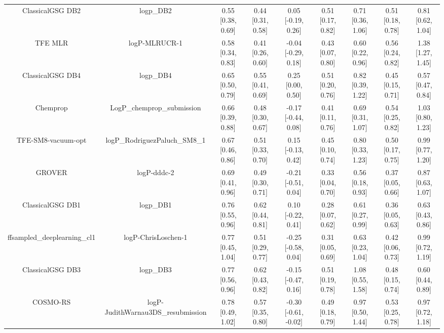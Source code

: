 \documentclass{article}
\begin{document}
\begin{center}
\begin{longtable}{|ccccccccc|}
\bottomrule
\endlastfoot
            ClassicalGSG DB2 &                                     logp\_DB2 & 0.55 [0.38, 0.69] & 0.44 [0.31, 0.58] &   0.05 [-0.19, 0.26] & 0.51 [0.17, 0.82] &    0.71 [0.36, 1.06] &    0.51 [0.18, 0.78] &    0.81 [0.62, 1.04] \\
                     TFE MLR &                                 logP-MLRUCR-1 & 0.58 [0.34, 0.83] & 0.41 [0.26, 0.60] &  -0.04 [-0.29, 0.18] & 0.43 [0.07, 0.80] &    0.60 [0.22, 0.96] &    0.56 [0.24, 0.82] &    1.38 [1.27, 1.45] \\
            ClassicalGSG DB4 &                                     logp\_DB4 & 0.65 [0.50, 0.79] & 0.55 [0.41, 0.69] &    0.25 [0.00, 0.50] & 0.51 [0.20, 0.76] &    0.82 [0.39, 1.22] &    0.45 [0.15, 0.71] &    0.57 [0.47, 0.84] \\
                    Chemprop &                    LogP\_chemprop\_submission & 0.66 [0.39, 0.88] & 0.48 [0.30, 0.67] &  -0.17 [-0.44, 0.08] & 0.41 [0.11, 0.76] &    0.69 [0.31, 1.07] &    0.54 [0.25, 0.82] &    1.03 [0.80, 1.23] \\
          TFE-SM8-vacuum-opt &                 logP\_RodriguezPaluch\_SM8\_1 & 0.67 [0.46, 0.86] & 0.51 [0.33, 0.70] &   0.15 [-0.13, 0.42] & 0.45 [0.10, 0.74] &    0.80 [0.33, 1.23] &    0.50 [0.17, 0.75] &    0.99 [0.77, 1.20] \\
                      GROVER &                                   logP-dddc-2 & 0.69 [0.41, 0.96] & 0.49 [0.30, 0.71] &  -0.21 [-0.51, 0.04] & 0.33 [0.04, 0.70] &    0.56 [0.18, 0.93] &    0.37 [0.05, 0.66] &    0.87 [0.63, 1.07] \\
            ClassicalGSG DB1 &                                     logp\_DB1 & 0.76 [0.55, 0.96] & 0.62 [0.44, 0.81] &   0.10 [-0.22, 0.41] & 0.28 [0.07, 0.62] &    0.61 [0.27, 0.99] &    0.36 [0.05, 0.63] &    0.63 [0.43, 0.86] \\
  ffsampled_deeplearning_cl1 &                           logP-ChrisLoschen-1 & 0.77 [0.45, 1.04] & 0.51 [0.29, 0.77] &  -0.25 [-0.58, 0.04] & 0.31 [0.05, 0.69] &    0.63 [0.23, 1.04] &    0.42 [0.06, 0.73] &    0.99 [0.72, 1.19] \\
            ClassicalGSG DB3 &                                     logp\_DB3 & 0.77 [0.56, 0.96] & 0.62 [0.43, 0.82] &  -0.15 [-0.47, 0.16] & 0.51 [0.19, 0.78] &    1.08 [0.55, 1.58] &    0.48 [0.15, 0.74] &    0.60 [0.44, 0.89] \\
                    COSMO-RS &            logP-JudithWarnau3DS\_resubmission & 0.78 [0.49, 1.02] & 0.57 [0.35, 0.80] & -0.30 [-0.61, -0.02] & 0.49 [0.18, 0.79] &    0.97 [0.50, 1.44] &    0.53 [0.25, 0.78] &    0.97 [0.72, 1.18] \\

\end{longtable}
\end{center}
\end{document}
